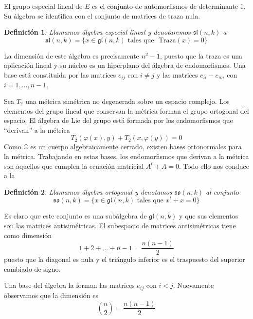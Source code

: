 \documentclass[a4paper,draft,12pt]{article}
\newtheorem{defi}{Definición}[section]%
\newcommand{\C}{\mathbb{C}}%
\newcommand{\df}[1]{\textsf{\color{blue}#1}}
\begin{document}
\bigskip

El grupo especial lineal de $E$ es el conjunto de automorfismos de determinante $1$.  Su álgebra se identifica con el conjunto de matrices de traza nula.

\begin{defi}

Llamamos  \df{álgebra especial lineal}  y denotaremos $\mathfrak{sl}(n,k)$ a
$$
\mathfrak{sl}(n,k)=\{ x \in \mathfrak{gl}(n,k) \text{ tales que } \text{ Traza}(x)=0\}
$$

\end{defi}

La dimensión de este álgebra es precisamente $n^2 -1$, puesto que la traza es una aplicación lineal y su núcleo es un hiperplano del álgebra de endomorfismos.  Una base está constituida por las matrices $e_{ij}$ con $i \neq j$ y las matrices $e_{ii}-e_{nn}$ con $i= 1, \dots, n-1$.

\bigskip

Sea $T_2$ una métrica simétrica no degenerada sobre un espacio complejo.  Los elementos del grupo lineal que conservan la métrica forman el grupo ortogonal del espacio.  El álgebra de Lie del grupo está formada por los endomorfismos que ``derivan'' a la métrica
$$
T_2(\varphi(x), y)+ T_2(x, \varphi(y))=0
$$
Como $\C$ es un cuerpo algebraicamente cerrado, existen bases ortonormales para la métrica.  Trabajando en estas bases, los endomorfismos que derivan a la métrica
son aquellos que cumplen la ecuación matricial $A^t+A=0$.  Todo ello nos conduce a la 

\begin{defi}

Llamamos  \df{álgebra ortogonal}  y denotamos $\mathfrak{so}(n,k)$ al conjunto
$$
\mathfrak{so}(n,k) = \{ x \in \mathfrak{gl}(n,k) \text{ tales que } x^t+x=0\}
$$

\end{defi}

Es claro que este conjunto es una subálgebra de $\mathfrak{gl}(n,k)$ y que sus elementos son las matrices antisimétricas.  El subespacio de matrices antisimétricas tiene como dimensión
$$1+2+ \dots+ n-1= \frac{n(n-1)}{2}
$$
puesto que la diagonal es nula y el triángulo inferior es el traspuesto del superior cambiado de signo.

Una base del álgebra la forman las matrices $e_{ij}$ con $i <j$. Nuevamente observamos que la dimensión es 
$$
\binom{n}{2}= \frac{n(n-1)}{2}
$$
\bigskip
\end{document}
